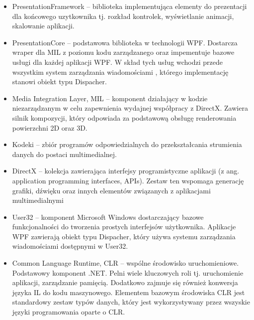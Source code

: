 \begin{itemize}
	\item PresentationFramework – biblioteka implementująca elementy do prezentacji dla końcowego uzytkownika tj. rozkład kontrolek, wyświetlanie animacji, skalowanie aplikacji. 
	
	\item PresentationCore – podstawowa biblioteka w technologii WPF. Dostarcza wraper dla MIL z poziomu kodu zarządzanego oraz impementuje bazowe  usługi dla każdej aplikacji WPF. W skład tych usług wchodzi przede wszystkim system zarządzania wiadomościami , którego implementację stanowi obiekt typu Dispacher.  
	
	\item Media Integration Layer, MIL – komponent działający w kodzie niezarządzanym w celu zapewnienia wydajnej współpracy  z DirectX.   Zawiera silnik kompozycji, który odpowiada za  podstawową obsługę renderowania powierzchni 2D oraz 3D.
	
	\item Kodeki – zbiór programów odpowiedzialnych do przekształcania strumienia danych do postaci multimedialnej.
	
	\item DirectX – kolekcja zawierająca interfejsy programistyczne aplikacji (z ang. application programming interfaces, APIs). Zestaw ten  wspomaga generację grafiki, dźwięku oraz innych elementów związanych z aplikacjami multimedialnymi
	
	\item User32 – komponent Microsoft Windows dostarczający bazowe funkcjonalności do tworzenia prostych interfejsów użytkownika.  Aplikacje WPF zawierają obiekt typu Dispacher, który używa systemu zarządzania wiadomościami dostępnymi w User32.
	
	\item Common Language Runtime, CLR – wspólne środowisko uruchomieniowe. Podstawowy komponent .NET. Pelni wiele kluczowych roli tj. uruchomienie aplikacji, zarządzanie pamięcią. Dodatkowo zajmuje się również konwersja języka IL do kodu maszynowego. Elementem bazowym środowiska CLR jest standardowy zestaw typów danych, który jest wykorzystywany przez wszyskie języki programowania oparte o CLR. 
	
\end{itemize}

